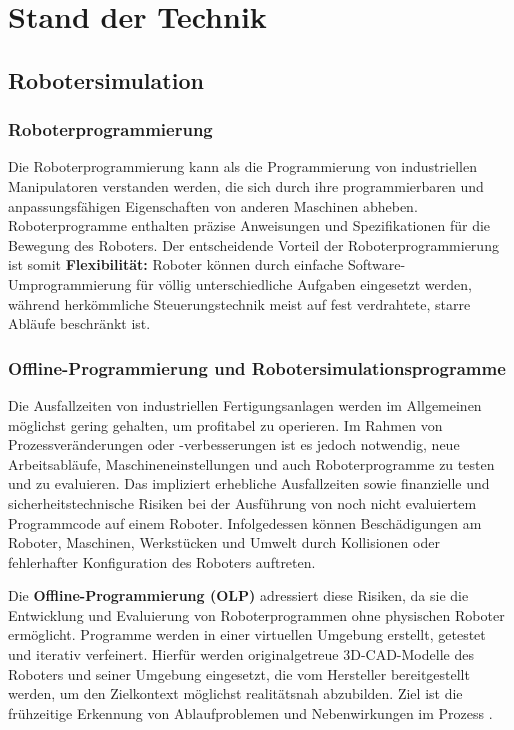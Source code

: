 
\chapter{Stand der Technik} \label{cap:Grundlagen}

\section{Robotersimulation}
\subsection{Roboterprogrammierung} Die Roboterprogrammierung kann als die
Programmierung von industriellen Manipulatoren verstanden werden, die sich durch
ihre programmierbaren und anpassungsfähigen Eigenschaften von anderen Maschinen
abheben. Roboterprogramme enthalten präzise Anweisungen und Spezifikationen für
die Bewegung des Roboters.  Der entscheidende
Vorteil der Roboterprogrammierung ist somit \textbf{Flexibilität:} Roboter
können durch einfache Software-Umprogrammierung für völlig unterschiedliche
Aufgaben eingesetzt werden, während herkömmliche Steuerungstechnik meist auf
fest verdrahtete, starre Abläufe beschränkt ist.

\subsection{Offline-Programmierung und Robotersimulationsprogramme} Die
Ausfallzeiten von industriellen Fertigungsanlagen werden im Allgemeinen
möglichst gering gehalten, um profitabel zu operieren. Im Rahmen von
Prozessveränderungen oder -verbesserungen ist es jedoch notwendig, neue
Arbeitsabläufe, Maschineneinstellungen und auch Roboterprogramme zu testen und
zu evaluieren. Das impliziert erhebliche Ausfallzeiten sowie finanzielle und
sicherheitstechnische Risiken bei der Ausführung von noch nicht evaluiertem
Programmcode auf einem Roboter.
Infolgedessen können Beschädigungen am
Roboter, Maschinen, Werkstücken und Umwelt durch Kollisionen oder fehlerhafter
Konfiguration des Roboters auftreten.

Die \textbf{Offline-Programmierung (OLP)} adressiert diese Risiken, da sie die
Entwicklung und Evaluierung von Roboterprogrammen ohne physischen Roboter
ermöglicht. Programme werden in einer virtuellen Umgebung erstellt, getestet und
iterativ verfeinert. Hierfür werden originalgetreue 3D-CAD-Modelle des Roboters
und seiner Umgebung eingesetzt, die vom Hersteller bereitgestellt werden, um den
Zielkontext möglichst realitätsnah abzubilden. Ziel ist die frühzeitige
Erkennung von Ablaufproblemen und Nebenwirkungen im Prozess
.


